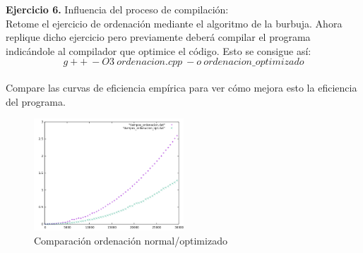 \documentclass[titlepage, 12pt,a4paper]{article}
\begin{document}

\textbf{\large Ejercicio 6.} Influencia del proceso de compilación:\\

Retome el ejercicio de ordenación mediante el algoritmo de la burbuja. Ahora replique
dicho ejercicio pero previamente deberá compilar el programa indicándole al compilador
que optimice el código. Esto se consigue así:
$$g++\ -O3\ ordenacion.cpp\ -o\ ordenacion\_optimizado$$
\\
Compare las curvas de eficiencia empírica para ver cómo mejora esto la eficiencia del
programa.
\\


\begin{figure}[!ht]
  \caption{Comparación ordenación normal/optimizado}
  \centering
    \includegraphics[width=0.5\textwidth]{./img/ef_pract_ej_6.png}
\end{figure}
 
\vspace {1em}  	
\end{document}
